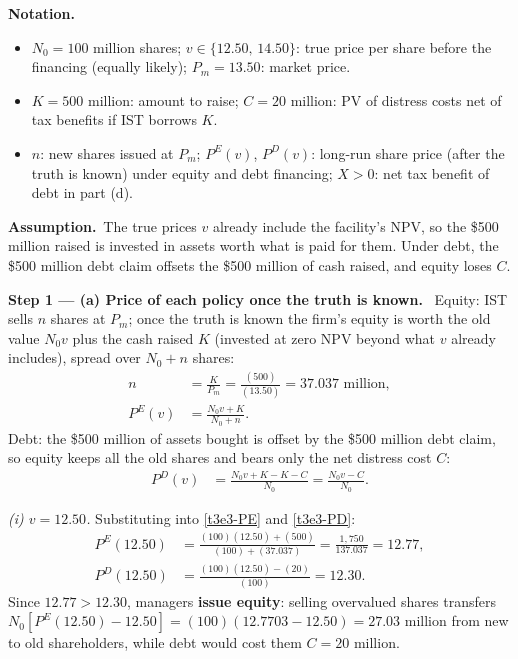 \documentclass[11pt,a4paper]{article}
\newcommand{\notation}{\par\noindent\textbf{Notation.}}
\newcommand{\step}[2]{\par\medskip\noindent\textbf{Step #1 --- #2.}~}
\newcommand{\assume}{\par\smallskip\noindent\textbf{Assumption.}~}
\begin{document}
\notation
\begin{itemize}
  \item $N_0=100$ million shares; $v\in\{12.50,\,14.50\}$: true price per share before the financing (equally likely); $P_m=13.50$: market price.
  \item $K=500$ million: amount to raise; $C=20$ million: PV of distress costs net of tax benefits if IST borrows $K$.
  \item $n$: new shares issued at $P_m$; $P^E(v)$, $P^D(v)$: long-run share price (after the truth is known) under equity and debt financing; $X>0$: net tax benefit of debt in part (d).
\end{itemize}

\assume The true prices $v$ already include the facility's NPV, so the \$500 million raised is invested in assets worth what is paid for them. Under debt, the \$500 million debt claim offsets the \$500 million of cash raised, and equity loses $C$.

\step{1}{(a) Price of each policy once the truth is known} Equity: IST sells $n$ shares at $P_m$; once the truth is known the firm's equity is worth the old value $N_0v$ plus the cash raised $K$ (invested at zero NPV beyond what $v$ already includes), spread over $N_0+n$ shares:
\begin{align}
  n &= \frac{K}{P_m} = \frac{(500)}{(13.50)} = 37.037 \text{ million}, \label{t3e3-n}\\
  P^E(v) &= \frac{N_0 v + K}{N_0+n}. \label{t3e3-PE}
\end{align}
Debt: the \$500 million of assets bought is offset by the \$500 million debt claim, so equity keeps all the old shares and bears only the net distress cost $C$:
\begin{align}
  P^D(v) &= \frac{N_0 v + K - K - C}{N_0} = \frac{N_0 v - C}{N_0}. \label{t3e3-PD}
\end{align}

\textit{(i) $v=12.50$.} Substituting into \eqref{t3e3-PE} and \eqref{t3e3-PD}:
\begin{align}
  P^E(12.50) &= \frac{(100)(12.50)+(500)}{(100)+(37.037)} = \frac{1{,}750}{137.037} = 12.77, \nonumber\\
  P^D(12.50) &= \frac{(100)(12.50)-(20)}{(100)} = 12.30. \nonumber
\end{align}
Since $12.77>12.30$, managers \textbf{issue equity}: selling overvalued shares transfers $N_0[P^E(12.50)-12.50]=(100)(12.7703-12.50)=27.03$ million from new to old shareholders, while debt would cost them $C=20$ million.
\end{document}
